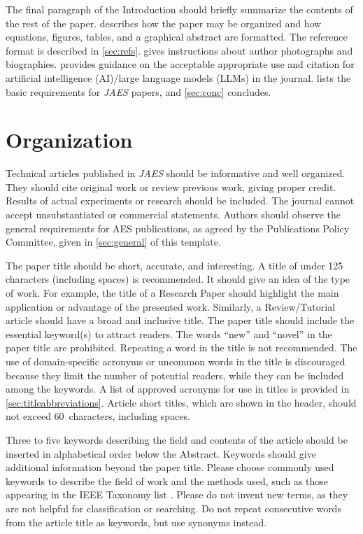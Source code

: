 \documentclass[fleqn,draft]{jaes}
\begin{document}
The final paragraph of the Introduction should briefly summarize the contents of the rest of the paper.  describes how the paper may be organized and how equations, figures, tables, and a graphical abstract are formatted. The reference format is described in \cref{sec:refs}.  gives instructions about author photographs and biographies.  provides guidance on the acceptable appropriate use and citation for artificial intelligence (AI)/large language models (LLMs) in the journal.  lists the basic requirements for \emph{JAES} papers, and \cref{sec:conc} concludes. 

\section{Organization}{\label{sec:org}}

Technical articles published in \emph{JAES} should be informative and well organized. They should cite original work or review previous work, giving proper credit. Results of actual experiments or research should be included. The journal cannot accept unsubstantiated or commercial statements. Authors should observe the general requirements for AES publications, as agreed by the Publications Policy Committee, given in \cref{sec:general} of this template.

The paper title should be short, accurate, and interesting. A title of under 125 characters (including spaces) is recommended. It should give an idea of the type of work. For example, the title of a Research Paper should highlight the main application or advantage of the presented work. Similarly, a Review/Tutorial article should have a broad and inclusive title. The paper title should include the essential keyword(s) to attract readers. The words “new” and “novel” in the paper title are prohibited. Repeating a word in the title is not recommended.
The use of domain-specific acronyms or uncommon words in the title is discouraged because they limit the number of potential readers, while they can be included among the keywords. A list of approved acronyms for use in titles is provided in \cref{sec:titleabbreviations}. Article short titles, which are shown in the header, should not exceed 60~characters, including spaces.

Three to five keywords describing the field and contents of the article should be inserted in alphabetical order below the Abstract. Keywords should give additional information beyond the paper title. Please choose commonly used keywords to describe the field of work and the methods used, such as those appearing in the IEEE Taxonomy list \cite{ieee-taxonomy}. Please do not invent new terms, as they are not helpful for classification or searching. Do not repeat consecutive words from the article title as keywords, but use synonyms instead. 
\end{document}
